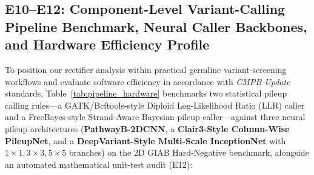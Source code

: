 \documentclass[10pt,a4paper]{article}
\begin{document}
\subsection{E10--E12: Component-Level Variant-Calling Pipeline Benchmark, Neural Caller Backbones, and Hardware Efficiency Profile}
\label{sec:pipeline_benchmark}
To position our rectifier analysis within practical germline variant-screening workflows and evaluate software efficiency in accordance with \textit{CMPB Update} standards, Table~\ref{tab:pipeline_hardware} benchmarks two statistical pileup calling rules---a GATK/Bcftools-style Diploid Log-Likelihood Ratio (LLR) caller and a FreeBayes-style Strand-Aware Bayesian pileup caller---against three neural pileup architectures (\textbf{PathwayB-2DCNN}, a \textbf{Clair3-Style Column-Wise PileupNet}, and a \textbf{DeepVariant-Style Multi-Scale InceptionNet} with $1\times 1, 3\times 3, 5\times 5$ branches) on the 2D GIAB Hard-Negative benchmark, alongside an automated mathematical unit-test audit (E12):
\end{document}
